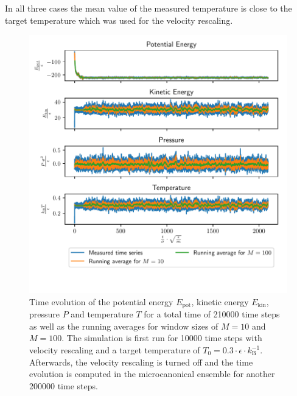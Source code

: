 \documentclass[a4paper,10pt,bibtotoc]{scrartcl}
\begin{document}
In all three cases the mean value of the measured temperature is close to the target temperature which was used for the velocity rescaling.
\begin{figure}
        \centering
        \includegraphics[width=\linewidth]{Figure_4.pdf}
    \caption{Time evolution of the potential energy $E_\mathrm{pot}$, kinetic energy $E_\mathrm{kin}$, pressure $P$ and temperature $T$ for a total time of 210000 time steps as well as the running averages for window sizes of $M=10$ and $M=100$. The simulation is first run for 10000 time steps with velocity rescaling and a target temperature of $T_0 = 0.3\cdot \epsilon\cdot k_\mathrm{B}^{-1}$. Afterwards, the velocity rescaling is turned off and the time evolution is computed in the microcanonical ensemble for another 200000 time steps.}
    \label{fig:fig4}
\end{figure}
\end{document}
